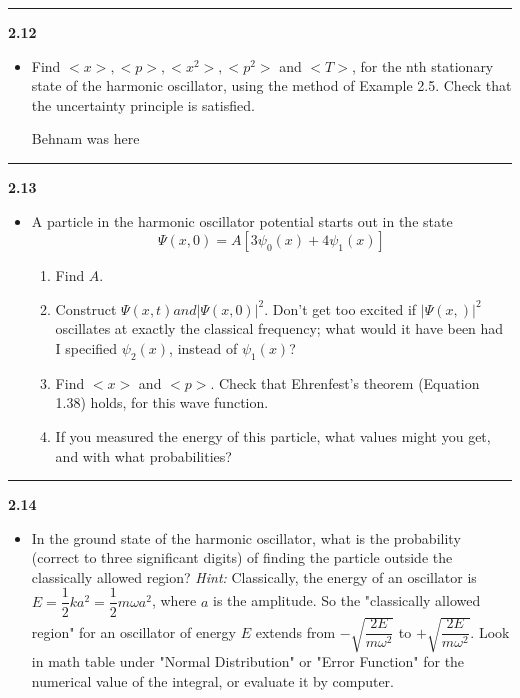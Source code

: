 \documentclass[fleqn]{article}
\begin{document}
  \rule{15cm}{1pt}

  \textbf{2.12}
  \begin{itemize}
    \item Find $<x>, <p>, <x^2>, <p^2>$ and $<T>$, for the nth stationary state of the harmonic oscillator,
    using the method of Example 2.5. Check that the uncertainty principle is satisfied.
    
    \textcolor{hwColor}{
      Behnam was here
    }
    
  \end{itemize}

  \rule{15cm}{1pt}

  \textbf{2.13}
  \begin{itemize}
    \item A particle in the harmonic oscillator potential starts out in the state 
    $$\Psi(x, 0)=A \left[3\psi_0(x)+4\psi_1(x)\right]$$ 
    \begin{enumerate}
      \item Find $A$.

      \item Construct $\Psi(x, t) and |\Psi(x, 0)|^2$. Don't get too excited if $|\Psi(x, )|^2$ oscillates 
      at exactly the classical frequency; what would it have been had I specified $\psi_2(x)$, instead of
      $\psi_1(x)$?

      \item Find $<x>$ and $<p>$. Check that Ehrenfest's theorem (Equation 1.38) holds, for this wave function.

      \item If you measured the energy of this particle, what values might you get, and with what probabilities?
    \end{enumerate}
  \end{itemize}

  \rule{15cm}{1pt}

  \textbf{2.14}
  \begin{itemize}
    \item In the ground state of the harmonic oscillator, what is the probability (correct to three
    significant digits) of finding the particle outside the classically allowed region?
    \emph{Hint:} Classically, the energy of an oscillator is $E=\dfrac{1}{2}ka^2=\dfrac{1}{2}m \omega a^2$,
    where $a$ is the amplitude. So the "classically allowed region" for an oscillator of energy $E$
    extends from $-\sqrt{\dfrac{2E}{m \omega^2}}$ to $+\sqrt{\dfrac{2E}{m \omega^2}}$. Look in math table
    under "Normal Distribution" or "Error Function" for the numerical value of the integral, or evaluate
    it by computer.
  \end{itemize}
\end{document}
